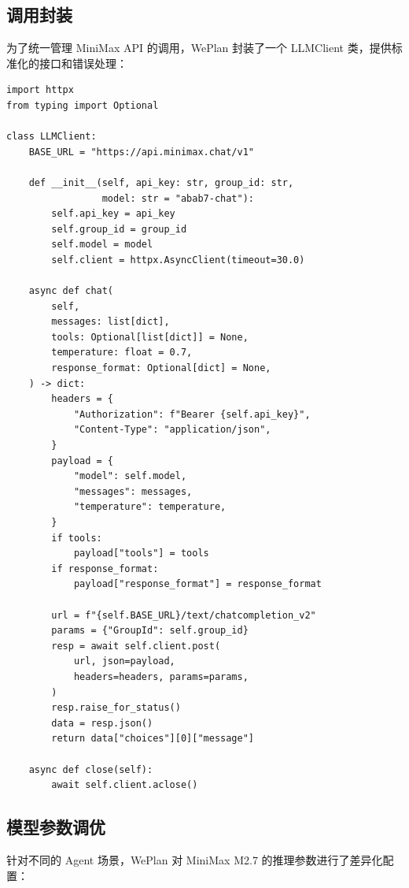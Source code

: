 \documentclass[12pt,a4paper]{ctexart}
\begin{document}
\subsection{调用封装}

为了统一管理 MiniMax API 的调用，WePlan 封装了一个 LLMClient 类，提供标准化的接口和错误处理：

\begin{lstlisting}[caption={LLMClient 封装},label={lst:llm-client}]
import httpx
from typing import Optional

class LLMClient:
    BASE_URL = "https://api.minimax.chat/v1"

    def __init__(self, api_key: str, group_id: str,
                 model: str = "abab7-chat"):
        self.api_key = api_key
        self.group_id = group_id
        self.model = model
        self.client = httpx.AsyncClient(timeout=30.0)

    async def chat(
        self,
        messages: list[dict],
        tools: Optional[list[dict]] = None,
        temperature: float = 0.7,
        response_format: Optional[dict] = None,
    ) -> dict:
        headers = {
            "Authorization": f"Bearer {self.api_key}",
            "Content-Type": "application/json",
        }
        payload = {
            "model": self.model,
            "messages": messages,
            "temperature": temperature,
        }
        if tools:
            payload["tools"] = tools
        if response_format:
            payload["response_format"] = response_format

        url = f"{self.BASE_URL}/text/chatcompletion_v2"
        params = {"GroupId": self.group_id}
        resp = await self.client.post(
            url, json=payload,
            headers=headers, params=params,
        )
        resp.raise_for_status()
        data = resp.json()
        return data["choices"][0]["message"]

    async def close(self):
        await self.client.aclose()
\end{lstlisting}

\subsection{模型参数调优}

针对不同的 Agent 场景，WePlan 对 MiniMax M2.7 的推理参数进行了差异化配置：
\end{document}
